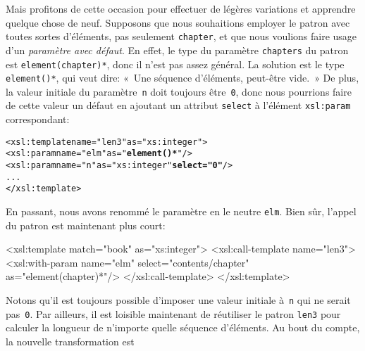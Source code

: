 Mais profitons de cette occasion pour effectuer de légères variations
et apprendre quelque chose de neuf. Supposons que nous souhaitions
employer le patron avec toutes sortes d'éléments, pas seulement
\texttt{chapter}, et que nous voulions faire usage d'un
\emph{paramètre avec défaut}. En effet, le type du paramètre
\texttt{chapters} du patron est \texttt{element(chapter)*}, donc il
n'est pas assez général. La solution est le type \texttt{element()*},
qui veut dire: «~Une séquence d'éléments, peut-être vide.~» De plus, la
valeur initiale du paramètre~\texttt{n} doit toujours être~\texttt{0},
donc nous pourrions faire de cette valeur un défaut en ajoutant un
attribut \texttt{select} à l'élément \texttt{xsl:param} correspondant:
\begin{alltt}
\small  <xsl:template name="len3" as="xs:integer">
    <xsl:param name="elm" as="\textbf{element()*}"/>
    <xsl:param name="n" as="xs:integer" \textbf{select="0"}/>
    ...
  </xsl:template>
\end{alltt}
En passant, nous avons renommé le paramètre en le neutre
\texttt{elm}. Bien sûr, l'appel du patron est maintenant plus court:
\begin{sverb}
  <xsl:template match="book" as="xs:integer">
    <xsl:call-template name="len3">
      <xsl:with-param name="elm" select="contents/chapter"
                                 as="element(chapter)*"/>
    </xsl:call-template>
  </xsl:template>
\end{sverb}
Notons qu'il est toujours possible d'imposer une valeur initiale
à~\texttt{n} qui ne serait pas~\texttt{0}. Par ailleurs, il est
loisible maintenant de réutiliser le patron \texttt{len3} pour
calculer la longueur de n'importe quelle séquence d'éléments. Au bout
du compte, la nouvelle transformation est


